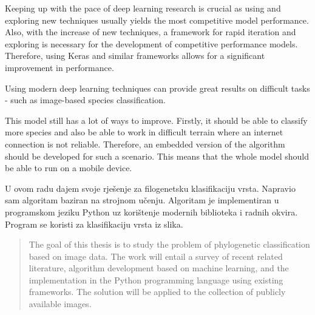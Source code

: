 \documentclass[times, utf8, diplomski]{fer}
\begin{document}
Keeping up with the pace of deep learning research is crucial as using and exploring new techniques usually yields the most competitive model performance. Also, with the increase of new techniques, a framework for rapid iteration and exploring is necessary for the development of competitive performance models. Therefore, using Keras and similar frameworks allows for a significant improvement in performance.

Using modern deep learning techniques can provide great results on difficult tasks - such as image-based species classification.

This model still has a lot of ways to improve. Firstly, it should be able to classify more species and also be able to work in difficult terrain where an internet connection is not reliable. Therefore, an embedded version of the algorithm should be developed for such a scenario. This means that the whole model should be able to run on a mobile device.






\begin{sazetak}
U ovom radu dajem svoje rješenje za filogenetsku klasifikaciju vrsta. Napravio sam algoritam baziran na strojnom učenju. Algoritam je implementiran u programskom jeziku Python uz korištenje modernih biblioteka i radnih okvira. Program se koristi za klasifikaciju vrsta iz slika.
 

\end{sazetak}

\begin{abstract}
The goal of this thesis is to study the problem of phylogenetic classification based on image data. The work will entail a survey of recent related literature, algorithm development based on machine learning, and the implementation in the Python programming language using existing frameworks. The solution will be applied to the collection of publicly available images.

\end{abstract}
\end{document}
